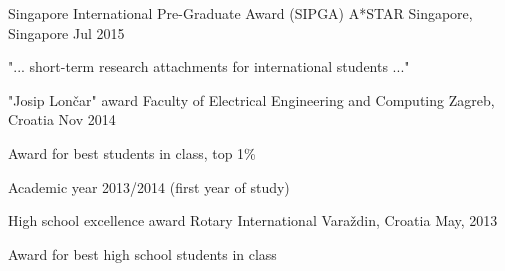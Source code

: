 \begin{cventries}
  \cventry
    {Singapore International Pre-Graduate Award (SIPGA)} %
    {A*STAR} %
    {Singapore, Singapore} %
    {Jul 2015} %
    {
      \begin{cvitems} %
        \item {"​... short-term research attachments for international students ..."​}
      \end{cvitems}
    }

  \cventry
    {"Josip Lončar"​ award} %
    {Faculty of Electrical Engineering and Computing} %
    {Zagreb, Croatia} %
    {Nov 2014} %
    {
      \begin{cvitems} %
        \item {Award for best students in class, top 1\%}
        \item {Academic year 2013/2014 (first year of study)}
      \end{cvitems}
    }

  \cventry
    {High school excellence award} %
    {Rotary International} %
    {Varaždin, Croatia} %
    {May, 2013} %
    {
      \begin{cvitems} %
        \item {Award for best high school students in class}
      \end{cvitems}
    }

\end{cventries}
